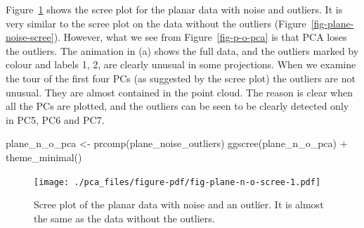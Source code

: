\documentclass[
  letterpaper,
]{book}
\newenvironment{Shaded}{\begin{snugshade}}{\end{snugshade}}
\newcommand{\FunctionTok}[1]{\textcolor[rgb]{0.28,0.35,0.67}{#1}}
\newcommand{\NormalTok}[1]{\textcolor[rgb]{0.00,0.23,0.31}{#1}}
\newcommand{\OtherTok}[1]{\textcolor[rgb]{0.00,0.23,0.31}{#1}}
\newcommand{\SpecialCharTok}[1]{\textcolor[rgb]{0.37,0.37,0.37}{#1}}
\begin{document}
Figure~\ref{fig-plane-n-o-scree} shows the scree plot for the planar
data with noise and outliers. It is very similar to the scree plot on
the data without the outliers (Figure~\ref{fig-plane-noise-scree}).
However, what we see from Figure~\ref{fig-p-o-pca} is that PCA loses the
outliers. The animation in (a) shows the full data, and the outliers
marked by colour and labels 1, 2, are clearly unusual in some
projections. When we examine the tour of the first four PCs (as
suggested by the scree plot) the outliers are not unusual. They are
almost contained in the point cloud. The reason is clear when all the
PCs are plotted, and the outliers can be seen to be clearly detected
only in PC5, PC6 and PC7.

\begin{Shaded}
\begin{Highlighting}[]
\NormalTok{plane\_n\_o\_pca }\OtherTok{\textless{}{-}} \FunctionTok{prcomp}\NormalTok{(plane\_noise\_outliers)}
\FunctionTok{ggscree}\NormalTok{(plane\_n\_o\_pca) }\SpecialCharTok{+} \FunctionTok{theme\_minimal}\NormalTok{()}
\end{Highlighting}
\end{Shaded}

\begin{figure}[H]

{\centering \texttt{[image: ./pca\_files/figure-pdf/fig-plane-n-o-scree-1.pdf]}

}

\caption{\label{fig-plane-n-o-scree}Scree plot of the planar data with
noise and an outlier. It is almost the same as the data without the
outliers.}

\end{figure}
\end{document}
